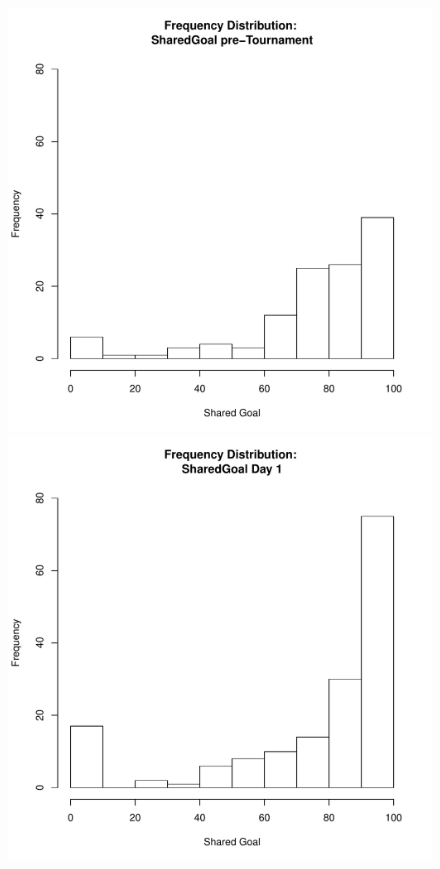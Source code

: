 \documentclass[12pt]{report}
\begin{document}
{%

\begin{figure}[htbp]
  \includegraphics[scale =.4]{../images/distSharedGoalPre.pdf}
  \includegraphics[scale =.4]{../images/distSharedGoalDay1.pdf}

\end{figure}}
\end{document}
